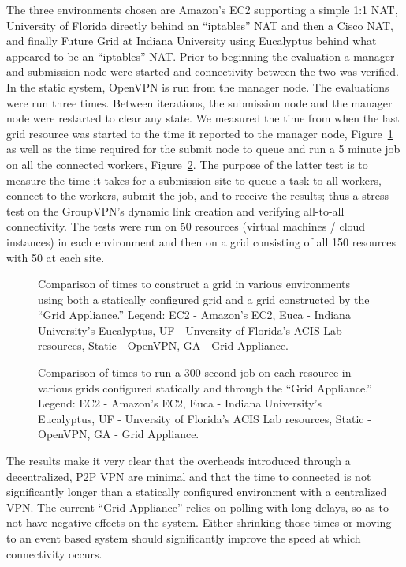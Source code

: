 \documentclass[conference]{IEEEtran}
\begin{document}
The three environments chosen are Amazon's EC2 supporting a simple 1:1 NAT,
University of Florida directly behind an ``iptables'' NAT and then a Cisco NAT,
and finally Future Grid at Indiana University using Eucalyptus behind what
appeared to be an ``iptables'' NAT.  Prior to beginning the evaluation a
manager and submission node were started and connectivity between the two was
verified.  In the static system, OpenVPN is run from the manager node.  The
evaluations were run three times.  Between iterations, the submission node and
the manager node were restarted to clear any state.  We measured the time from
when the last grid resource was started to the time it reported to the manager
node, Figure~\ref{fig:connect} as well as the time required for the submit node
to queue and run a 5 minute job on all the connected workers,
Figure~\ref{fig:run}.  The purpose of the latter test is to measure the time it
takes for a submission site to queue a task to all workers, connect to the
workers, submit the job, and to receive the results; thus a stress test on the
GroupVPN's dynamic link creation and verifying all-to-all connectivity.  The
tests were run on 50 resources (virtual machines / cloud instances) in each
environment and then on a grid consisting of all 150 resources with 50 at each
site.

\begin{figure}[ht]
\centering
{}
\caption{Comparison of times to construct a grid in various environments using
both a statically configured grid and a grid constructed by the ``Grid
Appliance.''  Legend:  EC2 - Amazon's EC2, Euca - Indiana University's
Eucalyptus, UF - Unversity of Florida's ACIS Lab resources, Static - OpenVPN,
GA - Grid Appliance.}
\label{fig:connect}
\end{figure}

\begin{figure}[ht]
\centering
{}
\caption{Comparison of times to run a 300 second job on each resource in
various grids configured statically and through the ``Grid Appliance.''
Legend:  EC2 - Amazon's EC2, Euca - Indiana University's Eucalyptus, UF -
Unversity of Florida's ACIS Lab resources, Static - OpenVPN, GA - Grid
Appliance.}
\label{fig:run}
\end{figure}

The results make it very clear that the overheads introduced through a
decentralized, P2P VPN are minimal and that the time to connected is not
significantly longer than a statically configured environment with a
centralized VPN.  The current ``Grid Appliance'' relies on polling with long
delays, so as to not have negative effects on the system.  Either shrinking
those times or moving to an event based system should significantly improve the
speed at which connectivity occurs.  
\end{document}
